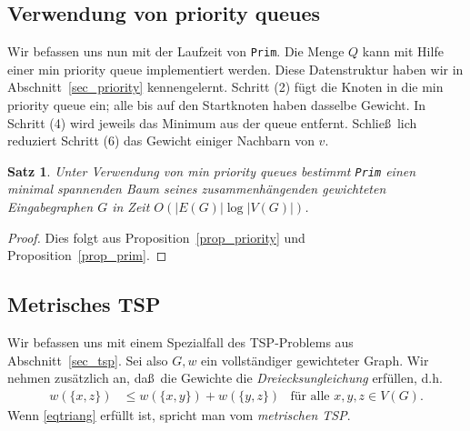 \documentclass[10pt,reqno]{amsart}
\numberwithin{equation}{section}
\newtheorem{theorem}[definition]{Satz}
\newcommand\Prop{Proposition}
\begin{document}
\subsection{Verwendung von priority queues}\label{sec_prim_priority}
Wir befassen uns nun mit der Laufzeit von {\tt Prim}.
Die Menge $Q$ kann mit Hilfe einer min priority queue implementiert werden.
Diese Datenstruktur haben wir in Abschnitt~\ref{sec_priority} kennengelernt.
Schritt (2) f\"ugt die Knoten in die min priority queue ein; alle bis auf den Startknoten haben dasselbe Gewicht.
In Schritt (4) wird jeweils das Minimum aus der queue entfernt.
Schlie\ss\ lich reduziert Schritt (6) das Gewicht einiger Nachbarn von $v$.

\begin{theorem}\label{thm_prim}
	Unter Verwendung von min priority queues bestimmt {\tt Prim} einen minimal spannenden Baum seines zusammenh\"angenden gewichteten Eingabegraphen $G$ in Zeit $O(|E(G)|\log|V(G)|)$.
\end{theorem}
\begin{proof}
	Dies folgt aus \Prop~\ref{prop_priority} und \Prop~\ref{prop_prim}.
\end{proof}

\subsection{Metrisches TSP}\label{sec_metric_tsp}
Wir befassen uns mit einem Spezialfall des TSP-Problems aus Abschnitt~\ref{sec_tsp}.
Sei also $G,w$ ein vollst\"andiger gewichteter Graph.
Wir nehmen zus\"atzlich an, da\ss\ die Gewichte die {\em Dreiecksungleichung} erf\"ullen, d.h.\
\begin{align}\label{eqtriang}
	w(\{x,z\})&\leq w(\{x,y\})+w(\{y,z\})&\mbox{f\"ur alle }x,y,z\in V(G).
\end{align}
Wenn \eqref{eqtriang} erf\"ullt ist, spricht man vom {\em metrischen TSP}.
\end{document}
